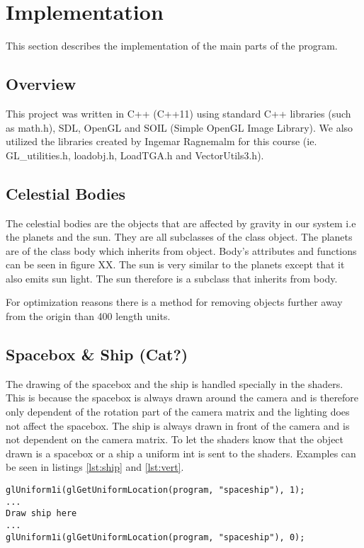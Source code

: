 \documentclass[a4paper,12pt]{article} \usepackage{graphicx}
\begin{document}
\section{Implementation}
This section describes the implementation of the main parts of the program. 
\subsection{Overview}
This project was written in C++ (C++11) using standard C++ libraries (such as
math.h), SDL, OpenGL and SOIL (Simple OpenGL Image Library). We also utilized the libraries created
by Ingemar Ragnemalm for this course (ie. GL\_utilities.h, loadobj.h, LoadTGA.h
and VectorUtils3.h).
\subsection{Celestial Bodies}
The celestial bodies are the objects that are affected by gravity in our system
i.e the planets and the sun. They are all subclasses of the class object. The
planets are of the class body which inherits from object. Body's attributes and
functions can be seen in figure XX. The sun is very similar to the planets
except that it also emits sun light. The sun therefore is a subclass that
inherits from body. 

For optimization reasons there is a method for removing objects further away
from the origin than 400 length units.
\subsection{Spacebox \& Ship (Cat?)}
The drawing of the spacebox and the ship is handled specially in the shaders.
This is because the spacebox is always drawn around the camera and is therefore
only dependent of the rotation part of the camera matrix and the lighting does
not affect the spacebox. The ship is always drawn in front of the camera and is
not dependent on the camera matrix. To let the shaders know that the object
drawn is a spacebox or a ship a uniform int is sent to the shaders. Examples
can be seen in listings \ref{lst:ship} and \ref{lst:vert}.

\begin{lstlisting}[caption={Draw spaceship}, label={lst:ship}]
glUniform1i(glGetUniformLocation(program, "spaceship"), 1);
...
Draw ship here
...
glUniform1i(glGetUniformLocation(program, "spaceship"), 0);
\end{lstlisting}
\end{document}
